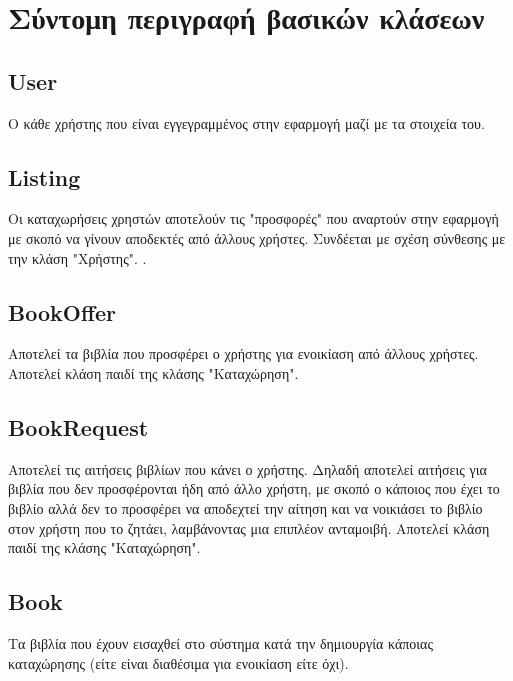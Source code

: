\documentclass[12pt,a4paper]{article}
\begin{document}
\section{Σύντομη περιγραφή βασικών κλάσεων}

\subsection{User}
Ο κάθε χρήστης που είναι εγγεγραμμένος στην εφαρμογή μαζί με τα στοιχεία του. 

\subsection{Listing}
Οι καταχωρήσεις χρηστών αποτελούν τις "προσφορές" που αναρτούν στην εφαρμογή με σκοπό να γίνουν αποδεκτές από άλλους χρήστες. Συνδέεται με σχέση σύνθεσης με την κλάση "Χρήστης".
.
\subsection{BookOffer}
Αποτελεί τα βιβλία που προσφέρει ο χρήστης για ενοικίαση από άλλους χρήστες. Αποτελεί κλάση παιδί της κλάσης "Καταχώρηση".

\subsection{BookRequest}
Αποτελεί τις αιτήσεις βιβλίων που κάνει ο χρήστης. Δηλαδή αποτελεί αιτήσεις για βιβλία που δεν προσφέρονται ήδη από άλλο χρήστη, με σκοπό ο κάποιος που έχει το βιβλίο αλλά δεν το προσφέρει να αποδεχτεί την αίτηση και να νοικιάσει το βιβλίο στον χρήστη που το ζητάει, λαμβάνοντας μια επιπλέον ανταμοιβή. Αποτελεί κλάση παιδί της κλάσης "Καταχώρηση".

\subsection{Book}
Τα βιβλία που έχουν εισαχθεί στο σύστημα κατά την δημιουργία κάποιας καταχώρησης (είτε είναι διαθέσιμα για ενοικίαση είτε όχι).
\end{document}

